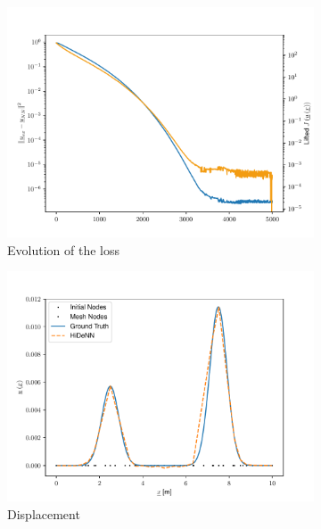 \begin{figure}
    \begin{subfigure}{0.3\linewidth}
        \centering
        \includegraphics[width=\linewidth]{Figures/Loss_Comaprison_Regul32.pdf}
        \caption{Evolution of the loss}
    \end{subfigure}
    \begin{subfigure}{0.3\linewidth}
        \centering
        \includegraphics[width=\linewidth]{Figures/Solution_displacement_Regul32.pdf}
        \caption{Displacement}
    \end{subfigure}
    \begin{subfigure}{0.3\linewidth}
        \centering

\end{subfigure}
\end{figure}

